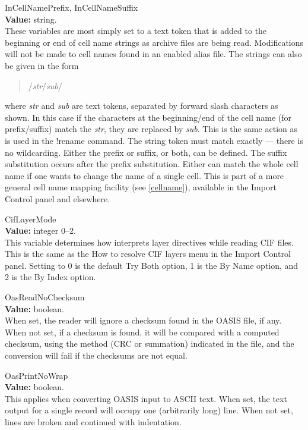 \begin{description}
\item{{\et InCellNamePrefix}, {\et InCellNameSuffix}}\\
{\bf Value:} string.\\
These variables are most simply set to a text token that is added to
the beginning or end of cell name strings as archive files are being
read.  Modifications will not be made to cell names found in an
enabled alias file.  The strings can also be given in the form
\begin{quote}
/{\it str\/}/{\it sub\/}/
\end{quote}
where {\it str} and {\it sub} are text tokens, separated by forward
slash characters as shown.  In this case if the characters at the
beginning/end of the cell name (for prefix/suffix) match the {\it
str}, they are replaced by {\it sub}.  This is the same action as is
used in the {\cb !rename} command.  The string token must match
exactly --- there is no wildcarding.  Either the prefix or suffix, or
both, can be defined.  The suffix substitution occurs after the prefix
substitution.  Either can match the whole cell name if one wants to
change the name of a single cell.  This is part of a more general cell
name mapping facility (see \ref{cellname}), available in the {\cb
Import Control} panel and elsewhere.

\item{\et CifLayerMode}\\
{\bf Value:} integer 0--2.\\
This variable determines how {\Xic} interprets layer directives while
reading CIF files.  This is the same as the {\cb How to resolve CIF
layers} menu in the {\cb Import Control} panel.  Setting to 0 is the
default {\cb Try Both} option, 1 is the {\cb By Name} option, and 2 is
the {\cb By Index} option.

\item{\et OasReadNoChecksum}\\
{\bf Value:} boolean.\\
When set, the reader will ignore a checksum found in the OASIS file,
if any.  When not set, if a checksum is found, it will be compared
with a computed checksum, using the method (CRC or summation)
indicated in the file, and the conversion will fail if the checksums
are not equal.

\item{\et OasPrintNoWrap}\\
{\bf Value:} boolean.\\
This applies when converting OASIS input to ASCII text.  When set, the
text output for a single record will occupy one (arbitrarily long)
line.  When not set, lines are broken and continued with indentation.


\end{description}
